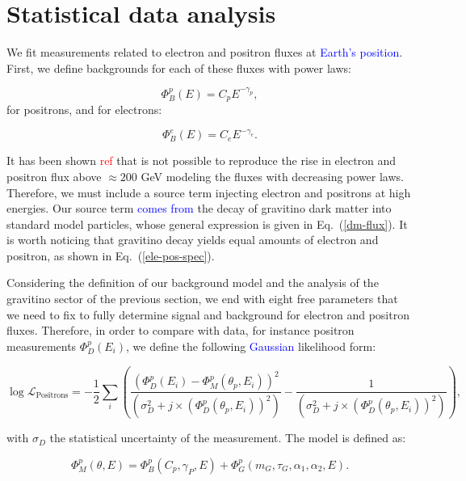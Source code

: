 \documentclass[a4paper,11pt]{article}
\newcommand*{\blue}{\textcolor{blue}}
\newcommand*{\red}{\textcolor{red}}
\begin{document}
\section{Statistical data analysis}
\label{sec:stats}

We fit measurements related to electron and positron fluxes at \blue{Earth's position}. First, we define backgrounds for each of these fluxes with power laws:

\begin{equation}
\Phi_B^p(E) = C_p E^{-\gamma_p}, 
\end{equation}
for positrons, and for electrons:

\begin{equation}
\Phi_B^e(E) = C_e E^{-\gamma_e}.
\end{equation}

It has been shown \red{ref} that is not possible to reproduce the rise in electron and positron flux above $\approx 200$ GeV modeling the fluxes with decreasing power laws. Therefore, we must include a source term injecting electron and positrons at high energies. Our source term \blue{comes from} the decay of gravitino dark matter into standard model particles, whose general expression is given in Eq.~(\ref{dm-flux}). It is worth noticing that gravitino decay yields equal amounts of electron and positron, as shown in Eq.~(\ref{ele-pos-spec}). 

Considering the definition of our background model and the analysis of the gravitino sector of the previous section, we end with eight free parameters that we need to fix to fully determine signal and background for electron and positron fluxes. Therefore, in order to compare with data, for instance positron measurements $\Phi_D^p(E_i)$, we define the following \blue{Gaussian} likelihood form:

\begin{equation}
\log  \mathcal{L}_{\text{Positrons}} = -\frac{1}{2} \sum_i{\left( \frac{(\Phi_D^p(E_i) - \Phi_M^p(\theta_p,E_i ))^2}{(\sigma_D^2 + j\times (\Phi_D^{p}(\theta_p,E_i))^2)} - \frac{1}{(\sigma_D^2 + j\times (\Phi_D^{p}(\theta_p,E_i))^2)}  \right) },
\end{equation}

\noindent with $\sigma_D$ the statistical uncertainty of the measurement. The model is defined as:

\begin{equation}
\Phi_M^p(\theta,E ) = \Phi_B^p(C_p, \gamma_P, E) + \Phi_{G}^{p}(m_G, \tau_G, \alpha_1, \alpha_2, E).
\end{equation}
\end{document}
